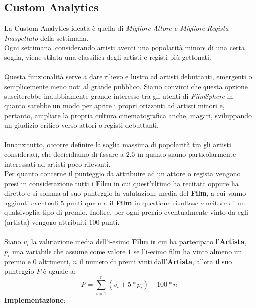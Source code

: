 \documentclass{article}
\begin{document}
\subsection{Custom Analytics}
La Custom Analytics ideata è quella di \textit{Migliore Attore e Migliore Regista Inaspettato} della settimana.\\
Ogni settimana, considerando artisti aventi una popolarità minore di una certa soglia, viene stilata una classifica degli artisti e registi più gettonati. \\ \\ 
Questa funzionalità serve a dare rilievo e lustro ad artisti debuttanti, emergenti o semplicemente meno noti al grande pubblico. Siamo convinti che questa opzione susciterebbe indubbiamente grande interesse tra gli utenti di \textit{FilmSphere} in quanto sarebbe un modo per aprire i propri orizzonti ad artisti minori e, pertanto, ampliare la propria cultura cinematografica anche, magari, sviluppando un giudizio critico verso attori o registi debuttanti. \\ \\ 
Innanzitutto, occorre definire la soglia massima di popolarità tra gli artisti considerati, che decicidiamo di fissare a $2.5$ in quanto siamo particolarmente interessati ad artisti poco rilevanti. \\ 
Per quanto concerne il punteggio da attribuire ad un attore o regista vengono presi in considerazione tutti i \textbf{Film} in cui quest'ultimo ha recitato oppure ha diretto e si somma al suo punteggio la valutazione media del \textbf{Film}, a cui vanno aggiunti eventuali $5$ punti qualora il \textbf{Film} in questione risultase vincitore di un qualsivoglia tipo di premio. Inoltre, per ogni premio eventualmente vinto da egli (artista) vengono attribuiti 100 punti. \\ \\ 
Siano $v_{i}$ la valutazione media dell'i-esimo \textbf{Film} in cui ha partecipato l'\textbf{Artista}, $p_{i}$ una variabile che assume come valore $1$ se l'i-esimo film ha vinto almeno un premio e $0$ altrimenti, $n$ il numero di premi vinti dall'\textbf{Artista}, allora il suo punteggio $P$ è uguale a:
\[ P = \sum_{i=1}^{n} (v_{i} + 5 * p_{i}) + 100 * n \]
\textbf{Implementazione}: 
\end{document}
